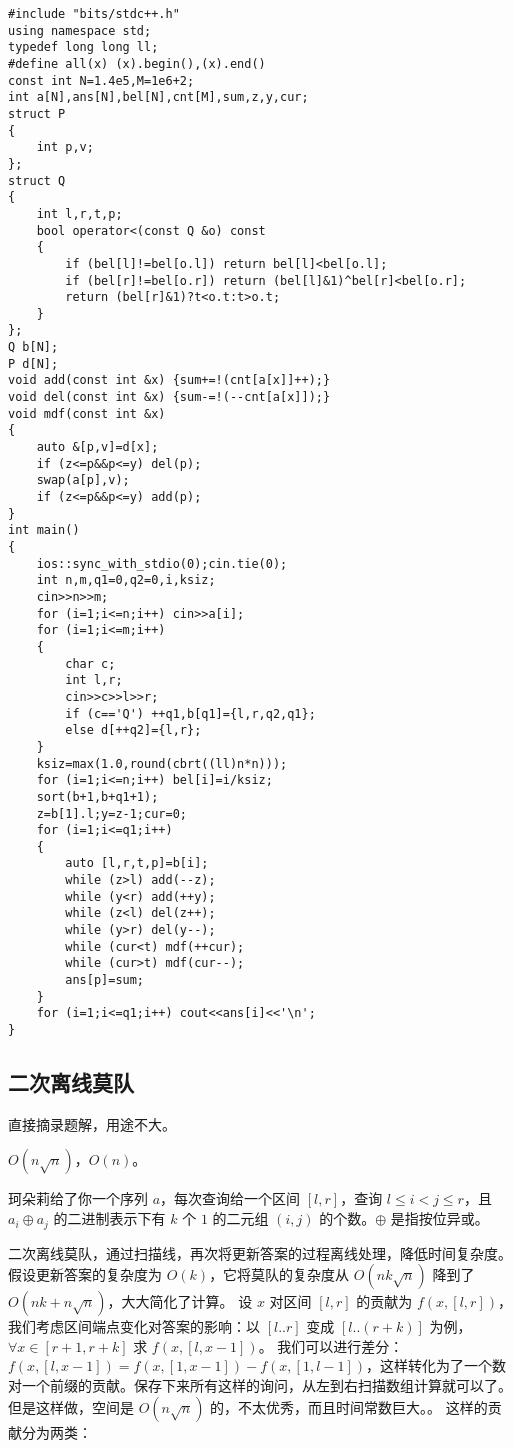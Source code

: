 \documentclass[12pt]{ctexart}
\begin{document}
\begin{lstlisting}
#include "bits/stdc++.h"
using namespace std;
typedef long long ll;
#define all(x) (x).begin(),(x).end()
const int N=1.4e5,M=1e6+2;
int a[N],ans[N],bel[N],cnt[M],sum,z,y,cur;
struct P
{
	int p,v;
};
struct Q
{
	int l,r,t,p;
	bool operator<(const Q &o) const
	{
		if (bel[l]!=bel[o.l]) return bel[l]<bel[o.l];
		if (bel[r]!=bel[o.r]) return (bel[l]&1)^bel[r]<bel[o.r];
		return (bel[r]&1)?t<o.t:t>o.t;
	}
};
Q b[N];
P d[N];
void add(const int &x) {sum+=!(cnt[a[x]]++);}
void del(const int &x) {sum-=!(--cnt[a[x]]);}
void mdf(const int &x)
{
	auto &[p,v]=d[x];
	if (z<=p&&p<=y) del(p);
	swap(a[p],v);
	if (z<=p&&p<=y) add(p);
}
int main()
{
	ios::sync_with_stdio(0);cin.tie(0);
	int n,m,q1=0,q2=0,i,ksiz;
	cin>>n>>m;
	for (i=1;i<=n;i++) cin>>a[i];
	for (i=1;i<=m;i++)
	{
		char c;
		int l,r;
		cin>>c>>l>>r;
		if (c=='Q') ++q1,b[q1]={l,r,q2,q1};
		else d[++q2]={l,r};
	}
	ksiz=max(1.0,round(cbrt((ll)n*n)));
	for (i=1;i<=n;i++) bel[i]=i/ksiz;
	sort(b+1,b+q1+1);
	z=b[1].l;y=z-1;cur=0;
	for (i=1;i<=q1;i++)
	{
		auto [l,r,t,p]=b[i];
		while (z>l) add(--z);
		while (y<r) add(++y);
		while (z<l) del(z++);
		while (y>r) del(y--);
		while (cur<t) mdf(++cur);
		while (cur>t) mdf(cur--);
		ans[p]=sum;
	}
	for (i=1;i<=q1;i++) cout<<ans[i]<<'\n';
}

\end{lstlisting}

\subsection{二次离线莫队}

直接摘录题解，用途不大。

$O(n\sqrt n)$，$O(n)$。

珂朵莉给了你一个序列 $a$，每次查询给一个区间 $[l,r]$，查询 $l \leq i< j \leq r$，且 $a_i \oplus a_j$ 的二进制表示下有 $k$ 个 $1$ 的二元组 $(i,j)$ 的个数。$\oplus$ 是指按位异或。

二次离线莫队，通过扫描线，再次将更新答案的过程离线处理，降低时间复杂度。假设更新答案的复杂度为 $O(k)$，它将莫队的复杂度从 $O(nk\sqrt n)$ 降到了 $O(nk + n\sqrt n)$，大大简化了计算。
设 $x$ 对区间 $[l,r]$ 的贡献为 $f(x,[l,r])$，我们考虑区间端点变化对答案的影响：以 $[l..r]$ 变成 $[l..(r+k)]$ 为例，$\forall x \in [r+1,r+k]$ 求 $f(x,[l,x-1])$。
我们可以进行差分：$f(x,[l,x-1])=f(x,[1,x-1])-f(x,[1,l-1])$，这样转化为了一个数对一个前缀的贡献。保存下来所有这样的询问，从左到右扫描数组计算就可以了。
但是这样做，空间是 $O(n\sqrt n)$ 的，不太优秀，而且时间常数巨大。。
这样的贡献分为两类：
\end{document}
